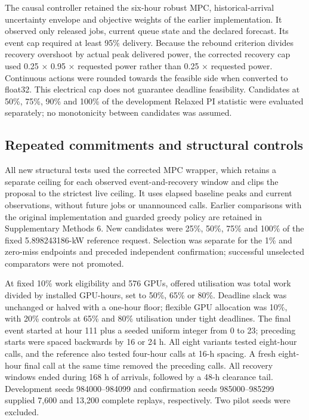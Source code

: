 \documentclass[10pt,a4paper]{article}
\begin{document}
The causal controller retained the six-hour robust MPC, historical-arrival uncertainty envelope and objective weights of the earlier implementation. It observed only released jobs, current queue state and the declared forecast. Its event cap required at least 95\% delivery. Because the rebound criterion divides recovery overshoot by actual peak delivered power, the corrected recovery cap used 0.25 × 0.95 × requested power rather than 0.25 × requested power. Continuous actions were rounded towards the feasible side when converted to float32. This electrical cap does not guarantee deadline feasibility. Candidates at 50\%, 75\%, 90\% and 100\% of the development Relaxed PI statistic were evaluated separately; no monotonicity between candidates was assumed.


\subsection*{Repeated commitments and structural controls}

All new structural tests used the corrected MPC wrapper, which retains a separate ceiling for each observed event-and-recovery window and clips the proposal to the strictest live ceiling. It uses elapsed baseline peaks and current observations, without future jobs or unannounced calls. Earlier comparisons with the original implementation and guarded greedy policy are retained in Supplementary Methods 6. New candidates were 25\%, 50\%, 75\% and 100\% of the fixed 5.898243186-kW reference request. Selection was separate for the 1\% and zero-miss endpoints and preceded independent confirmation; successful unselected comparators were not promoted.


At fixed 10\% work eligibility and 576 GPUs, offered utilisation was total work divided by installed GPU-hours, set to 50\%, 65\% or 80\%. Deadline slack was unchanged or halved with a one-hour floor; flexible GPU allocation was 10\%, with 20\% controls at 65\% and 80\% utilisation under tight deadlines. The final event started at hour 111 plus a seeded uniform integer from 0 to 23; preceding starts were spaced backwards by 16 or 24 h. All eight variants tested eight-hour calls, and the reference also tested four-hour calls at 16-h spacing. A fresh eight-hour final call at the same time removed the preceding calls. All recovery windows ended during 168 h of arrivals, followed by a 48-h clearance tail. Development seeds 984000–984099 and confirmation seeds 985000–985299 supplied 7,600 and 13,200 complete replays, respectively. Two pilot seeds were excluded.
\end{document}
